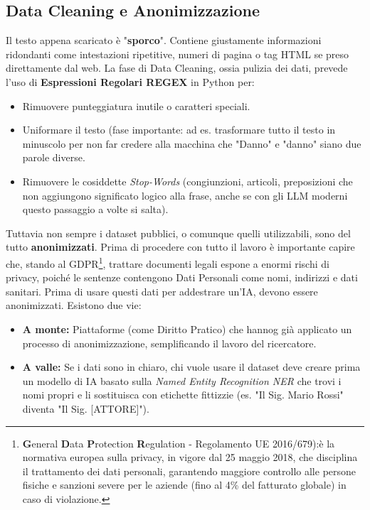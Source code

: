 \documentclass{article}
\begin{document}
\subsection{Data Cleaning e Anonimizzazione}
Il testo appena scaricato è "\textbf{sporco}". Contiene giustamente informazioni ridondanti come intestazioni ripetitive, numeri di pagina o tag HTML se preso direttamente dal web. La fase di Data Cleaning, ossia pulizia dei dati, prevede l'uso di \textbf{Espressioni Regolari REGEX} in Python per:
\begin{itemize}
    \item Rimuovere punteggiatura inutile o caratteri speciali.

    \item Uniformare il testo (fase importante: ad es. trasformare tutto il testo in minuscolo per non far credere alla macchina che "Danno" e "danno" siano due parole diverse.

    \item Rimuovere le cosiddette \textit{Stop-Words} (congiunzioni, articoli, preposizioni che non aggiungono significato logico alla frase, anche se con gli LLM moderni questo passaggio a volte si salta).
\end{itemize}
Tuttavia non sempre i dataset pubblici, o comunque quelli utilizzabili, sono del tutto \textbf{anonimizzati}. Prima di procedere con tutto il lavoro è importante capire che, stando al GDPR\footnote{\textbf{G}eneral \textbf{D}ata \textbf{P}rotection\textbf{ R}egulation - Regolamento UE 2016/679):è la normativa europea sulla privacy, in vigore dal 25 maggio 2018, che disciplina il trattamento dei dati personali, garantendo maggiore controllo alle persone fisiche e sanzioni severe per le aziende (fino al 4\% del fatturato globale) in caso di violazione.}, trattare documenti legali espone a enormi rischi di privacy, poiché le sentenze contengono Dati Personali come nomi, indirizzi e dati sanitari. Prima di usare questi dati per addestrare un'IA, devono essere anonimizzati.
Esistono due vie:
\begin{itemize}
    \item \textbf{A monte:} Piattaforme (come Diritto Pratico) che hannog già applicato un processo di anonimizzazione, semplificando il lavoro del ricercatore.

    \item \textbf{A valle:} Se i dati sono in chiaro, chi vuole usare il dataset deve creare prima un modello di IA basato sulla \textit{Named Entity Recognition NER} che trovi i nomi propri e li sostituisca con etichette fittizzie (es. "Il Sig. Mario Rossi" diventa "Il Sig. [ATTORE]").
    
\end{itemize}
\end{document}
